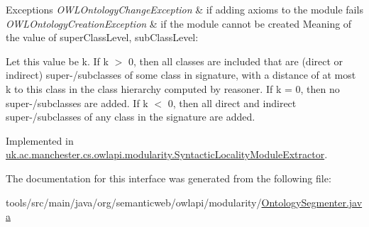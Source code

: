 \begin{DoxyExceptions}{Exceptions}
{\em O\-W\-L\-Ontology\-Change\-Exception} & if adding axioms to the module fails \\
\hline
{\em O\-W\-L\-Ontology\-Creation\-Exception} & if the module cannot be created Meaning of the value of super\-Class\-Level, sub\-Class\-Level\-:\par
 Let this value be k. If k $>$ 0, then all classes are included that are (direct or indirect) super-\//subclasses of some class in signature, with a distance of at most k to this class in the class hierarchy computed by reasoner. If k = 0, then no super-\//subclasses are added. If k $<$ 0, then all direct and indirect super-\//subclasses of any class in the signature are added. \\
\hline
\end{DoxyExceptions}


Implemented in \hyperlink{classuk_1_1ac_1_1manchester_1_1cs_1_1owlapi_1_1modularity_1_1_syntactic_locality_module_extractor_ae58c3a77d2ce8da48a7cadecb3dff9b4}{uk.\-ac.\-manchester.\-cs.\-owlapi.\-modularity.\-Syntactic\-Locality\-Module\-Extractor}.



The documentation for this interface was generated from the following file\-:\begin{DoxyCompactItemize}
\item 
tools/src/main/java/org/semanticweb/owlapi/modularity/\hyperlink{_ontology_segmenter_8java}{Ontology\-Segmenter.\-java}\end{DoxyCompactItemize}
